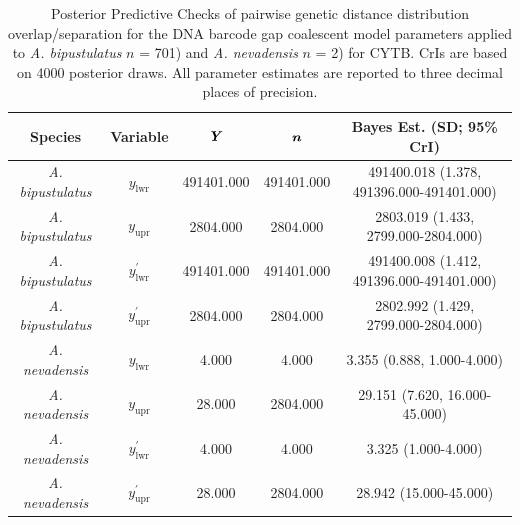 \documentclass[12pt]{article}
\begin{document}
\begin{landscape}
\begin{table}[H]

\centering

\caption{Posterior Predictive Checks of pairwise genetic distance distribution overlap/separation for the DNA barcode gap coalescent model parameters applied to \textit{A. bipustulatus} $n$ = 701) and \textit{A. nevadensis} $n$ = 2) for CYTB. CrIs are based on 4000 posterior draws. All parameter estimates are reported to three decimal places of precision.}

\begin{tabular}{ccccc} \hline

\textbf{Species} & \textbf{Variable} & $\textbf{\textit{Y}}$ & $\textbf{\textit{n}}$ & \textbf{Bayes Est. (SD; 95\% CrI)} \\  \hline

\textit{A. bipustulatus} & $y_\mathrm{lwr}$ & 491401.000 & 491401.000 & 491400.018 (1.378, 491396.000-491401.000) \\
\textit{A. bipustulatus} & $y_\mathrm{upr}$ & 2804.000 & 2804.000 & 2803.019 (1.433, 2799.000-2804.000) \\
\textit{A. bipustulatus} & $y^{'}_\mathrm{lwr}$ & 491401.000 & 491401.000 & 491400.008 (1.412, 491396.000-491401.000) \\
\textit{A. bipustulatus} & $y^{'}_\mathrm{upr}$ & 2804.000 & 2804.000 & 2802.992 (1.429, 2799.000-2804.000) \\

\textit{A. nevadensis} & $y_\mathrm{lwr}$ & 4.000 & 4.000 & 3.355 (0.888, 1.000-4.000) \\
\textit{A. nevadensis} & $y_\mathrm{upr}$ & 28.000 & 2804.000 & 29.151 (7.620, 16.000-45.000) \\
\textit{A. nevadensis} & $y^{'}_\mathrm{lwr}$ & 4.000 & 4.000 & 3.325 (1.000-4.000) \\
\textit{A. nevadensis} & $y^{'}_\mathrm{upr}$ & 28.000 & 2804.000 & 28.942 (15.000-45.000)  \\


\hline


\end{tabular}

\end{table}
\end{landscape}

\newpage
\end{document}
